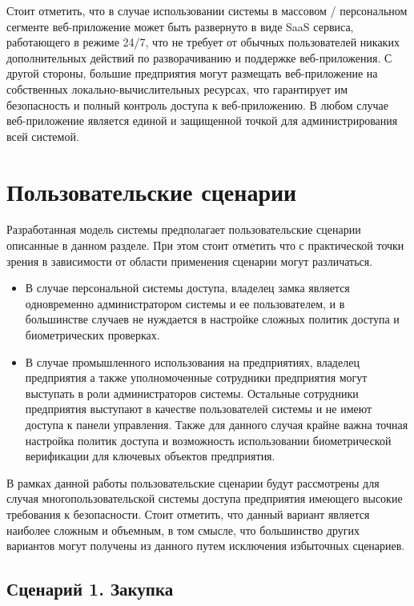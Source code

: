 Стоит отметить, что в случае использовании системы в массовом / персональном сегменте веб-приложение может быть развернуто в виде SaaS сервиса, работающего в режиме 24/7, что не требует от обычных пользователей никаких дополнительных действий по разворачиванию и поддержке веб-приложения. С другой стороны, большие предприятия могут размещать веб-приложение на собственных локально-вычислительных ресурсах, что гарантирует им безопасность и полный контроль доступа к веб-приложению. В любом случае веб-приложение является единой и защищенной точкой для администрирования всей системой.

\section{Пользовательские сценарии} \label{sect2_3}

Разработанная модель системы предполагает пользовательские сценарии описанные в данном разделе. При этом стоит отметить что с практической точки зрения в зависимости от области применения сценарии могут различаться. 

\begin{itemize}
	\item В случае персональной системы доступа, владелец замка является одновременно администратором системы и ее пользователем, и в большинстве случаев не нуждается в настройке сложных политик доступа и биометрических проверках. 

	\item В случае промышленного использования на предприятиях, владелец предприятия а также уполномоченные сотрудники предприятия могут выступать в роли администраторов системы. Остальные сотрудники предприятия выступают в качестве пользователей системы и не имеют доступа к панели управления. Также для данного случая крайне важна точная настройка политик доступа и возможность использовании биометрической верификации для ключевых объектов предприятия.
\end{itemize} 

В рамках данной работы пользовательские сценарии будут рассмотрены для случая многопользовательской системы доступа предприятия имеющего высокие требования к безопасности. Стоит отметить, что данный вариант является наиболее сложным и объемным, в том смысле, что большинство других вариантов могут получены из данного путем исключения избыточных сценариев.

\subsection{Сценарий 1. Закупка} \label{subsect2_3_1}

